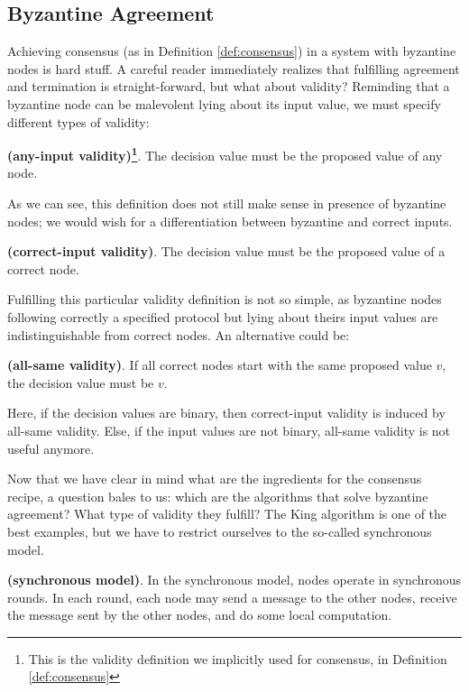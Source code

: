 \bigskip
\subsection{Byzantine Agreement}
Achieving consensus (as in Definition \ref{def:consensus}) in a system with byzantine nodes is hard stuff. A careful reader immediately realizes that fulfilling agreement and termination is straight-forward, but what about validity? Reminding that a byzantine node can be malevolent lying about its input value, we must specify different types of validity:
\begin{mydef}{\bf (any-input validity)\footnote{This is the validity definition we implicitly used for consensus, in Definition \ref{def:consensus}}}.
    The decision value must be the proposed value of any node.
\end{mydef}
\noindent
As we can see, this definition does not still make sense in presence of byzantine nodes; we would wish for a differentiation between byzantine and correct inputs.
\begin{mydef}{\bf (correct-input validity)}.
    The decision value must be the proposed value of a correct node.
\end{mydef}
\noindent
Fulfilling this particular validity definition is not so simple, as byzantine nodes following correctly a specified protocol but lying about theirs input values are indistinguishable from correct nodes. An alternative could be:
\begin{mydef}{\bf (all-same validity)}.
    If all correct nodes start with the same proposed value $v$, the decision value must be $v$.
\end{mydef}
\noindent
Here, if the decision values are binary, then correct-input validity is induced by all-same validity. Else, if the input values are not binary, all-same validity is not useful anymore.

\bigskip
\noindent
Now that we have clear in mind what are the ingredients for the consensus recipe, a question bales to us: which are the algorithms that solve byzantine agreement? What type of validity they fulfill? The King algorithm is one of the best examples, but we have to restrict ourselves to the so-called synchronous model.
\begin{mydef}{\bf (synchronous model)}.
    In the synchronous model, nodes operate in synchronous rounds. In each round, each node may send a message to the other nodes, receive the message sent by the other nodes, and do some local computation.
\end{mydef}

